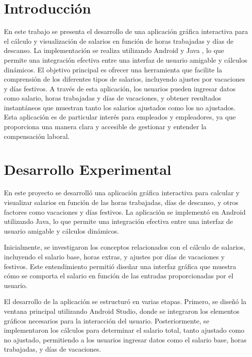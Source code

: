 \documentclass[conference]{IEEEtran}
\begin{document}
\section{Introducción}

En este trabajo se presenta el desarrollo de una aplicación gráfica interactiva para el cálculo y visualización de salarios en función de horas trabajadas y días de descanso. La implementación se realiza utilizando Android \cite{anatohipervisor1} y Java \cite{anatohipervisor2}, lo que permite una integración efectiva entre una interfaz de usuario amigable y cálculos dinámicos. El objetivo principal es ofrecer una herramienta que facilite la comprensión de los diferentes tipos de salarios, incluyendo ajustes por vacaciones y días festivos. A través de esta aplicación, los usuarios pueden ingresar datos como salario, horas trabajadas y días de vacaciones, y obtener resultados instantáneos que muestran tanto los salarios ajustados como los no ajustados. Esta aplicación es de particular interés para empleados y empleadores, ya que proporciona una manera clara y accesible de gestionar y entender la compensación laboral.


\section{Desarrollo Experimental}

En este proyecto se desarrolló una aplicación gráfica interactiva para calcular y visualizar salarios en función de las horas trabajadas, días de descanso, y otros factores como vacaciones y días festivos. La aplicación se implementó en Android utilizando Java, lo que permite una integración efectiva entre una interfaz de usuario amigable y cálculos dinámicos.

Inicialmente, se investigaron los conceptos relacionados con el cálculo de salarios, incluyendo el salario base, horas extras, y ajustes por días de vacaciones y festivos\cite{anatohipervisor3}. Este entendimiento permitió diseñar una interfaz gráfica que muestra cómo se comporta el salario en función de las entradas proporcionadas por el usuario\cite{anatohipervisor4}.

El desarrollo de la aplicación se estructuró en varias etapas. Primero, se diseñó la ventana principal utilizando Android Studio, donde se integraron los elementos gráficos necesarios para la interacción del usuario\cite{anatohipervisor5}. Posteriormente, se implementaron los cálculos para determinar el salario total, tanto ajustado como no ajustado\cite{anatohipervisor6}, permitiendo a los usuarios ingresar datos como el salario base, horas trabajadas, y días de vacaciones.
\end{document}
